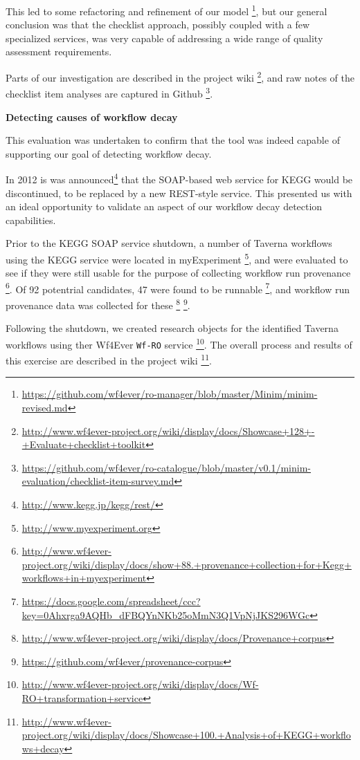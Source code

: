This led to some refactoring and refinement of our model \footnote{\url{https://github.com/wf4ever/ro-manager/blob/master/Minim/minim-revised.md}},
but our general conclusion was that the checklist approach, possibly
coupled with a few specialized services, was very capable of addressing
a wide range of quality assessment requirements.

Parts of our investigation are described in the project wiki \footnote{\url{http://www.wf4ever-project.org/wiki/display/docs/Showcase+128+-+Evaluate+checklist+toolkit}},
and raw notes of the checklist item analyses are captured in Github
\footnote{\url{https://github.com/wf4ever/ro-catalogue/blob/master/v0.1/minim-evaluation/checklist-item-survey.md}}.

\textbf{Detecting causes of workflow decay}

This evaluation was undertaken to confirm that the tool was indeed
capable of supporting our goal of detecting workflow decay.

In 2012 is was announced\footnote{\url{http://www.kegg.jp/kegg/rest/}}
that the SOAP-based web service for KEGG would be discontinued, to be
replaced by a new REST-style service. This presented us with an ideal
opportunity to validate an aspect of our workflow decay detection
capabilities.

Prior to the KEGG SOAP service shutdown, a number of Taverna workflows
using the KEGG service were located in myExperiment \footnote{\url{http://www.myexperiment.org}},
and were evaluated to see if they were still usable for the purpose of
collecting workflow run provenance \footnote{\url{http://www.wf4ever-project.org/wiki/display/docs/show+88.+provenance+collection+for+Kegg+workflows+in+myexperiment}}.
Of 92 potentrial candidates, 47 were found to be runnable \footnote{\url{https://docs.google.com/spreadsheet/ccc?key=0Ahxrga9AQHb_dFBQYnNKb25oMmN3Q1VpNjJKS296WGc}},
and workflow run provenance data was collected for these \footnote{\url{http://www.wf4ever-project.org/wiki/display/docs/Provenance+corpus}}
\footnote{\url{https://github.com/wf4ever/provenance-corpus}}.

Following the shutdown, we created research objects for the identified
Taverna workflows using ther Wf4Ever \texttt{Wf-RO} service \footnote{\url{http://www.wf4ever-project.org/wiki/display/docs/Wf-RO+transformation+service}}.
The overall process and results of this exercise are described in the
project wiki \footnote{\url{http://www.wf4ever-project.org/wiki/display/docs/Showcase+100.+Analysis+of+KEGG+workflows+decay}}.

